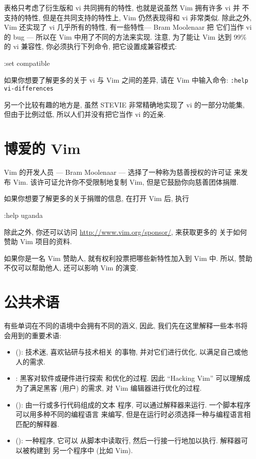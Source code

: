 表格只考虑了衍生版和 vi 共同拥有的特性, 也就是说虽然 Vim 拥有许多 vi 并
不支持的特性, 但是在共同支持的特性上, Vim 仍然表现得和 vi 非常类似.
除此之外, Vim 还实现了 vi 几乎所有的特性, 有一些特性--- Bram Moolenaar 把
它们当作 vi 的 bug --- 所以在 Vim 中用了不同的方法来实现. 注意, 为了能让
Vim 达到 99\% 的 vi 兼容性, 你必须执行下列命令, 把它设置成兼容模式:
\begin{vimcmd}
:set compatible
\end{vimcmd}
\begin{warning}
    如果你想要了解更多的关于 vi 与 Vim 之间的差异, 请在 Vim 中输入命令:
    \texttt{:help vi-differences}
\end{warning}
另一个比较有趣的地方是, 虽然 STEVIE 非常精确地实现了 vi 的一部分功能集,
但由于比例过低, 所以人们并没有把它当作 vi 的近亲.

\section{博爱的 Vim}
\label{sec:vim_is_charityware}
Vim 的开发人员 --- Bram Moolenaar --- 选择了一种称为慈善授权的许可证
来发布 Vim. 该许可证允许你不受限制地复制 Vim, 但是它鼓励你向慈善团体捐赠.

如果你想要了解更多的关于捐赠的信息, 在打开 Vim 后, 执行
\begin{vimcmd}
:help uganda
\end{vimcmd}
除此之外, 你还可以访问 \url{http://www.vim.org/sponsor/}, 来获取更多的
关于如何赞助 Vim 项目的资料.

如果你是一名 Vim 赞助人, 就有权利投票把哪些新特性加入到 Vim 中. 所以, 
赞助不仅可以帮助他人, 还可以影响 Vim 的演变.

\section{公共术语}
\label{sec:common_terminology}

有些单词在不同的语境中会拥有不同的涵义, 因此, 我们先在这里解释一些本书将
会用到的重要术语:
\begin{itemize}
    \item {} (): 技术迷, 喜欢钻研与技术相关
        的事物, 并对它们进行优化, 以满足自己或他人的需求.
    \item {}: 黑客对软件或硬件进行探索
        和优化的过程. 因此 ``Hacking Vim'' 可以理解成为了满足黑客 (用户)
        的需求, 对 Vim 编辑器进行优化的过程.
    \item {} (): 由一行或多行代码组成的文本
        程序, 可以通过解释器来运行. 一个脚本程序可以用多种不同的编程语言
        来编写, 但是在运行时必须选择一种与编程语言相匹配的解释器.
    \item {} (): 一种程序, 它可以
        从脚本中读取行, 然后一行接一行地加以执行. 解释器可以被构建到
        另一个程序中 (比如 Vim).
\end{itemize}

